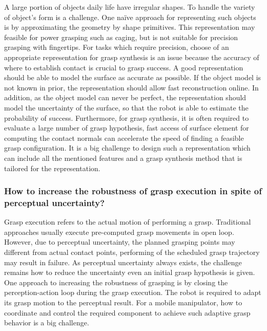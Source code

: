 A large portion of objects daily life have irregular shapes. To handle the variety of object's form is a challenge. One na\"ive approach for representing such objects is by approximating the geometry by  shape primitives. This representation may feasible for power grasping such as caging, but is not suitable for precision grasping with fingertips. For tasks which require precision, choose of an appropriate representation for grasp synthesis is an issue because the accuracy of where to establish contact is crucial to grasp success. A good representation should be able to model the surface as accurate as possible. If the object model is not known in prior, the representation should allow fast reconstruction online. In addition, as the object model can never be perfect, the representation should model the uncertainty of the surface, so that the robot is able to estimate the probability of success. Furthermore, for grasp synthesis, it is often required to evaluate a large number of grasp hypothesis, fast access of surface element for computing the contact normals can accelerate the speed of finding a feasible grasp configuration. It is a big challenge to design such a representation which can include all the mentioned features and a grasp synthesis method that is tailored for the representation. 

\subsubsection{How to increase the robustness of grasp execution in spite of perceptual uncertainty?}
Grasp execution refers to the actual motion of performing a grasp. Traditional approaches usually execute pre-computed grasp movements in open loop. However, due to perceptual uncertainty, the planned grasping points may different from actual contact points, performing of the scheduled grasp trajectory may result in failure. As perceptual uncertainty always exists, the challenge remains how to reduce the uncertainty even an initial grasp hypothesis is given. One approach to increasing the robustness of grasping is by closing the perception-action loop during the grasp execution. The robot is required to adapt its grasp motion to the perceptual result. For a mobile manipulator, how to coordinate and control the required component to achieve such adaptive grasp behavior is a big challenge.   


